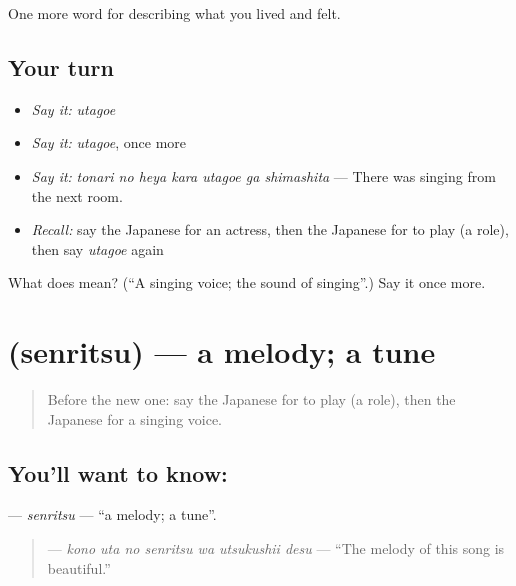 \begin{grammarlens}[title={What you've built}]
One more word for describing what you lived and felt.
\end{grammarlens}

\subsection*{Your turn}
\begin{itemize}
\raggedright
  \item \emph{Say it:} \emph{utagoe}
  \item \emph{Say it:} \emph{utagoe}, once more
  \item \emph{Say it:} \emph{tonari no heya kara utagoe ga shimashita} — There was singing from the next room.
  \item \emph{Recall:} say the Japanese for an actress, then the Japanese for to play (a role), then say \emph{utagoe} again
\end{itemize}

\begin{tcolorbox}[breakable,colback=teal!4,colframe=teal!35!black,title={Before you move on}]
What does  mean? (\textquotedblleft{}A singing voice; the sound of singing\textquotedblright{}.) Say it once more.
\end{tcolorbox}
\section[\texorpdfstring{\ja{せんりつ} (senritsu)}{せんりつ (senritsu)}]{ (senritsu) — a melody; a tune}

\label{lesson:JA-C503-senritsu}



\begin{quote}
Before the new one: say the Japanese for to play (a role), then the Japanese for a singing voice.
\end{quote}

\subsection*{You'll want to know: }
\textbf{} — \emph{senritsu} — \textquotedblleft{}a melody; a tune\textquotedblright{}.

\begin{quote}
\textbf{   } — \emph{kono uta no senritsu wa utsukushii desu} — \textquotedblleft{}The melody of this song is beautiful.\textquotedblright{}
\end{quote}

